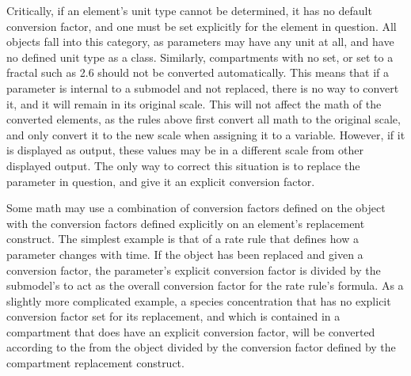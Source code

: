 Critically, if an element's unit type cannot be determined, it has no
default conversion factor, and one must be set explicitly for the
element in question.  All \Parameter objects fall into this category, as
parameters may have any unit at all, and have no defined unit type as a
class.  Similarly, compartments with no  set, or
set to a fractal  such as 2.6 should not be
converted automatically.  This means that if a parameter is internal to
a submodel and not replaced, there is no way to convert it, and it will
remain in its original scale.  This will not affect the math of the
converted elements, as the rules above first convert all math to the
original scale, and only convert it to the new scale when assigning it
to a variable.  However, if it is displayed as output, these values may
be in a different scale from other displayed output.  The only way to
correct this situation is to replace the parameter in question, and give
it an explicit conversion factor.

Some math may use a combination of conversion factors defined on the
\Submodel object with the conversion factors defined explicitly on an
element's replacement construct.  The simplest example is that of a rate
rule that defines how a parameter changes with time.  If the \Parameter
object has been replaced and given a conversion factor, the parameter's
explicit conversion factor is divided by the submodel's
 to act as the overall conversion factor for
the rate rule's formula.  As a slightly more complicated example, a
species concentration that has no explicit conversion factor set for its
replacement, and which is contained in a compartment that does have an
explicit conversion factor, will be converted according to the
 from the \Submodel object divided by
the conversion factor defined by the compartment replacement construct.

